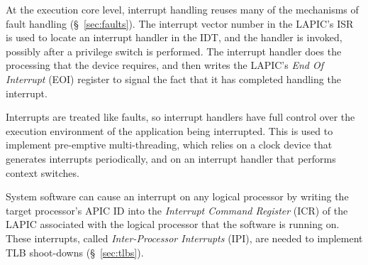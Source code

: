 
At the execution core level, interrupt handling reuses many of the mechanisms
of fault handling (\S~\ref{sec:faults}). The interrupt vector number in the
LAPIC's ISR is used to locate an interrupt handler in the IDT, and the handler
is invoked, possibly after a privilege switch is performed. The interrupt
handler does the processing that the device requires, and then writes the
LAPIC's \textit{End Of Interrupt} (EOI) register to signal the fact that it has
completed handling the interrupt.

Interrupts are treated like faults, so interrupt handlers have full control
over the execution environment of the application being interrupted. This is
used to implement pre-emptive multi-threading, which relies on a clock device
that generates interrupts periodically, and on an interrupt handler that
performs context switches.

System software can cause an interrupt on any logical processor by writing the
target processor's APIC ID into the \textit{Interrupt Command Register} (ICR)
of the LAPIC associated with the logical processor that the software is running
on. These interrupts, called \textit{Inter-Processor Interrupts} (IPI), are
needed to implement TLB shoot-downs (\S~\ref{sec:tlbs}).
